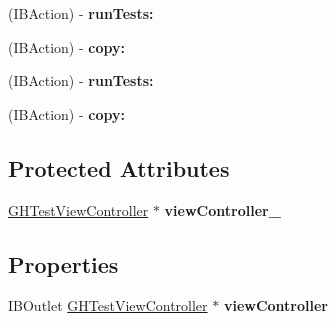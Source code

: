 \begin{DoxyCompactItemize}
\item 
\hypertarget{interface_g_h_test_window_controller_aead0e949635d3ba7ed6a0e1b55784ddb}{
(\-I\-B\-Action) -\/ {\bfseries run\-Tests\-:}}
\label{interface_g_h_test_window_controller_aead0e949635d3ba7ed6a0e1b55784ddb}

\item 
\hypertarget{interface_g_h_test_window_controller_a671dea0daf28bdb2ed43c583734701d8}{
(\-I\-B\-Action) -\/ {\bfseries copy\-:}}
\label{interface_g_h_test_window_controller_a671dea0daf28bdb2ed43c583734701d8}

\item 
\hypertarget{interface_g_h_test_window_controller_aead0e949635d3ba7ed6a0e1b55784ddb}{
(\-I\-B\-Action) -\/ {\bfseries run\-Tests\-:}}
\label{interface_g_h_test_window_controller_aead0e949635d3ba7ed6a0e1b55784ddb}

\item 
\hypertarget{interface_g_h_test_window_controller_a671dea0daf28bdb2ed43c583734701d8}{
(\-I\-B\-Action) -\/ {\bfseries copy\-:}}
\label{interface_g_h_test_window_controller_a671dea0daf28bdb2ed43c583734701d8}

\end{DoxyCompactItemize}
\subsection*{\-Protected \-Attributes}
\begin{DoxyCompactItemize}
\item 
\hypertarget{interface_g_h_test_window_controller_af149d590226b3b457f13a2ff89156189}{
\hyperlink{interface_g_h_test_view_controller}{\-G\-H\-Test\-View\-Controller} $\ast$ {\bfseries view\-Controller\-\_\-}}
\label{interface_g_h_test_window_controller_af149d590226b3b457f13a2ff89156189}

\end{DoxyCompactItemize}
\subsection*{\-Properties}
\begin{DoxyCompactItemize}
\item 
\hypertarget{interface_g_h_test_window_controller_a3e4ad8f30370593aed13e151576a28fe}{
\-I\-B\-Outlet \hyperlink{interface_g_h_test_view_controller}{\-G\-H\-Test\-View\-Controller} $\ast$ {\bfseries view\-Controller}}
\label{interface_g_h_test_window_controller_a3e4ad8f30370593aed13e151576a28fe}

\end{DoxyCompactItemize}


